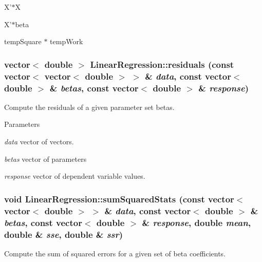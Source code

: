 X'$\ast$X

X'$\ast$beta

tempSquare $\ast$ tempWork 

\hypertarget{classLinearRegression_a1c6ed479606439a1943f75c888e8f2bd}{
\subsubsection[{residuals}]{\setlength{\rightskip}{0pt plus 5cm}vector$<$ double $>$ LinearRegression::residuals (const vector$<$ vector$<$ double $>$ $>$ \& {\em data}, \/  const vector$<$ double $>$ \& {\em betas}, \/  const vector$<$ double $>$ \& {\em response})}}
\label{classLinearRegression_a1c6ed479606439a1943f75c888e8f2bd}
Compute the residuals of a given parameter set betas.


\begin{DoxyParams}{Parameters}
\item[{\em data}]vector of vectors. \item[{\em betas}]vector of parameters \item[{\em response}]vector of dependent variable values. \end{DoxyParams}
\hypertarget{classLinearRegression_a54ba438eebfb5045c7e6d02545adf346}{
\subsubsection[{sumSquaredStats}]{\setlength{\rightskip}{0pt plus 5cm}void LinearRegression::sumSquaredStats (const vector$<$ vector$<$ double $>$ $>$ \& {\em data}, \/  const vector$<$ double $>$ \& {\em betas}, \/  const vector$<$ double $>$ \& {\em response}, \/  double {\em mean}, \/  double \& {\em sse}, \/  double \& {\em ssr})}}
\label{classLinearRegression_a54ba438eebfb5045c7e6d02545adf346}
Compute the sum of squared errors for a given set of beta coefficients.


